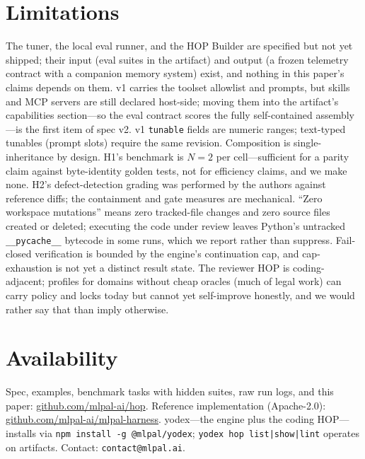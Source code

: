 \documentclass[10pt]{article}
\begin{document}
\section{Limitations}

The tuner, the local eval runner, and the HOP Builder are specified but not yet shipped; their input
(eval suites in the artifact) and output (a frozen telemetry contract with a companion memory system)
exist, and nothing in this paper's claims depends on them. v1 carries the toolset allowlist and
prompts, but skills and MCP servers are still declared host-side; moving them into the artifact's
capabilities section---so the eval contract scores the fully self-contained assembly---is the first
item of spec v2. v1 \texttt{tunable} fields are numeric ranges; text-typed tunables (prompt slots)
require the same revision. Composition is single-inheritance by design. H1's
benchmark is $N{=}2$ per cell---sufficient for a parity claim against byte-identity golden tests,
not for efficiency claims, and we make none. H2's defect-detection grading was performed by the
authors against reference diffs; the containment and gate measures are mechanical. ``Zero workspace
mutations'' means zero tracked-file changes and zero source files created or deleted; executing the
code under review leaves Python's untracked \texttt{\_\_pycache\_\_} bytecode in some runs, which we
report rather than suppress. Fail-closed verification is bounded by the engine's continuation cap,
and cap-exhaustion is not yet a distinct result state. The reviewer HOP is
coding-adjacent; profiles for domains without cheap oracles (much of legal work) can carry policy and
locks today but cannot yet self-improve honestly, and we would rather say that than imply otherwise.

\section{Availability}

Spec, examples, benchmark tasks with hidden suites, raw run logs, and this paper:
\href{https://github.com/mlpal-ai/hop}{github.com/mlpal-ai/hop}. Reference implementation (Apache-2.0):
\href{https://github.com/mlpal-ai/mlpal-harness}{github.com/mlpal-ai/mlpal-harness}. yodex---the
engine plus the coding HOP---installs via \texttt{npm install -g @mlpal/yodex}; \texttt{yodex hop
list|show|lint} operates on artifacts. Contact: \texttt{contact@mlpal.ai}.
\end{document}
